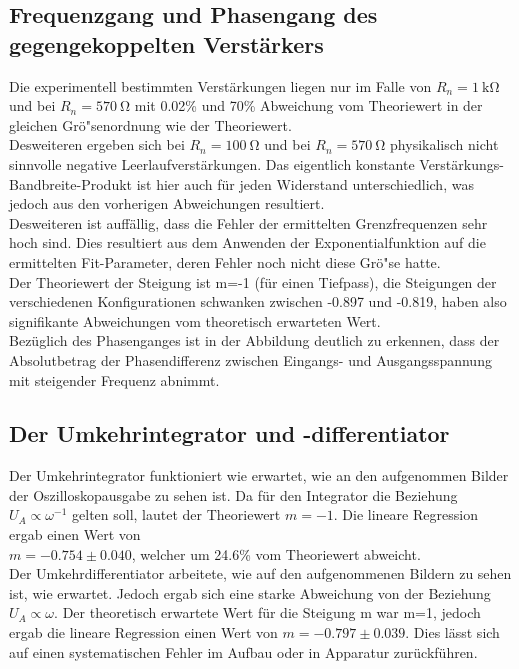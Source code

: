 \documentclass[]{scrartcl}
\begin{document}
\subsection{Frequenzgang und Phasengang des gegengekoppelten Verstärkers}
Die experimentell bestimmten Verstärkungen liegen nur im Falle von $R_n=\SI{1}{\kilo\ohm}$ und bei $R_n=\SI{570}{\ohm}$ mit 0.02\% und 70\% Abweichung vom Theoriewert in der gleichen Grö"senordnung wie der Theoriewert. \\
Desweiteren ergeben sich bei $R_n=\SI{100}{\ohm}$ und bei $R_n=\SI{570}{\ohm}$ physikalisch nicht sinnvolle negative Leerlaufverstärkungen. Das eigentlich konstante Verstärkungs-Bandbreite-Produkt ist hier auch für jeden Widerstand unterschiedlich, was jedoch aus den vorherigen Abweichungen resultiert. \\
Desweiteren ist auffällig, dass die Fehler der ermittelten Grenzfrequenzen sehr hoch sind. Dies resultiert aus dem Anwenden der Exponentialfunktion auf die ermittelten Fit-Parameter, deren Fehler noch nicht diese Grö"se hatte. \\
Der Theoriewert der Steigung ist m=-1 (für einen Tiefpass), die Steigungen der verschiedenen Konfigurationen schwanken zwischen -0.897 und -0.819, haben also signifikante Abweichungen vom theoretisch erwarteten Wert. \\
Bezüglich des Phasenganges ist in der Abbildung deutlich zu erkennen, dass der Absolutbetrag der Phasendifferenz zwischen Eingangs- und Ausgangsspannung mit steigender Frequenz abnimmt. 

\subsection{Der Umkehrintegrator und -differentiator}
Der Umkehrintegrator funktioniert wie erwartet, wie an den aufgenommen Bilder der Oszilloskopausgabe zu sehen ist. Da für den Integrator die Beziehung $U_A\propto\omega^{-1}$ gelten soll, lautet der Theoriewert $m=-1$. Die lineare Regression ergab einen Wert von  \\$m=-0.754\pm0.040$, welcher um 24.6\% vom Theoriewert abweicht. \\
Der Umkehrdifferentiator arbeitete, wie auf den aufgenommenen Bildern zu sehen ist, wie erwartet. Jedoch ergab sich eine starke Abweichung von der Beziehung $U_A\propto\omega$. Der theoretisch erwartete Wert für die Steigung m war m=1, jedoch ergab die lineare Regression einen Wert von $m = -0.797 \pm 0.039$. Dies lässt sich auf einen systematischen Fehler im Aufbau oder in Apparatur zurückführen.
\end{document}
